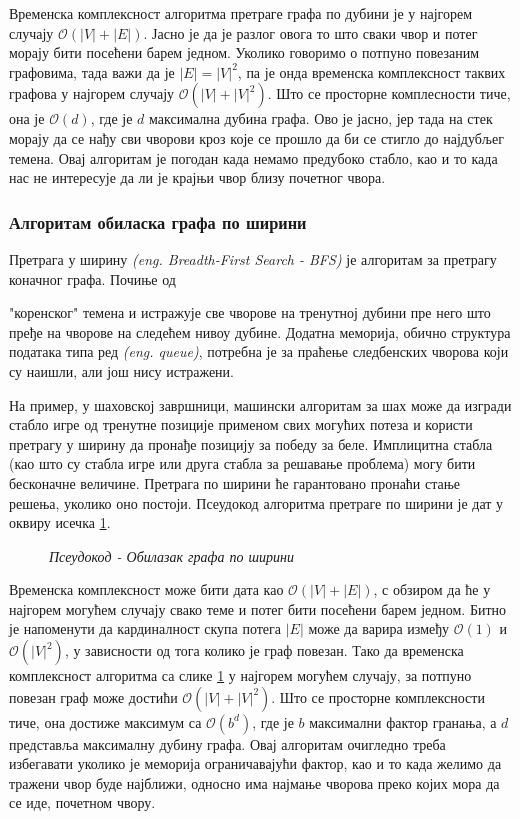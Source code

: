 \par
Временска комплексност алгоритма претраге графа по дубини је у најгорем случају $\mathcal{O}(|V| + |E|)$. Јасно је да је разлог овога то што сваки чвор и потег морају бити посећени барем једном. Уколико говоримо о потпуно повезаним графовима, тада важи да је $|E| = |V|^2$, па је онда временска комплексност таквих графова у најгорем случају $\mathcal{O}(|V| + |V|^2)$. Што се просторне комплесности тиче, она је $\mathcal{O}(d)$, где је $d$ максимална дубина графа. Ово је јасно, јер тада на стек морају да се нађу сви чворови кроз које се прошло да би се стигло до најдубљег темена. Овај алгоритам је погодан када немамо предубоко стабло, као и то када нас не интересује да ли је крајњи чвор близу почетног чвора.

\subsubsection{Алгоритам обиласка графа по ширини}
Претрага у ширину \textit{(eng. Breadth-First Search - BFS)} је алгоритам за претрагу коначног графа. Почиње од \par{"коренског"} темена и истражује све чворове на тренутној дубини пре него што пређе на чворове на следећем нивоу дубине. Додатна меморија, обично структура података типа ред \textit{(eng. queue)}, потребна је за праћење следбенских чворова који су наишли, али још нису истражени.

\par
На пример, у шаховској завршници, машински алгоритам за шах може да изгради стабло игре од тренутне позиције применом свих могућих потеза и користи претрагу у ширину да пронађе позицију за победу за беле. Имплицитна стабла (као што су стабла игре или друга стабла за решавање проблема) могу бити бесконачне величине. Претрага по ширини ће гарантовано пронаћи стање решења, уколико оно постоји. Псеудокод алгоритма претраге по ширини је дат у оквиру исечка \ref{pseudocode:algorithm-bfs-traversal-pseudo}.

\begin{figure}[h!]
\centering

\caption{\textit{Псеудокод - Обилазак графа по ширини}}
\label{pseudocode:algorithm-bfs-traversal-pseudo}
\end{figure}

\par
Временска комплексност може бити дата као $\mathcal{O}(|V| + |E|)$, с обзиром да ће у најгорем могућем случају свако теме и потег бити посећени барем једном. Битно је напоменути да кардиналност скупа потега $|E|$ може да варира између $\mathcal{O}(1)$ и $\mathcal{O}(|V|^2)$, у зависности од тога колико је граф повезан. Тако да временска комплексност алгоритма са слике \ref{pseudocode:algorithm-bfs-traversal-pseudo} у најгорем могућем случају, за потпуно повезан граф може достићи $\mathcal{O}(|V|+|V|^2)$. Што се просторне комплексности тиче, она достиже максимум са $\mathcal{O}(b^d)$, где је $b$ максимални фактор гранања, а $d$ представља максималну дубину графа. Овај алгоритам очигледно треба избегавати уколико је меморија ограничавајући фактор, као и то када желимо да тражени чвор буде најближи, односно има најмање чворова преко којих мора да се иде, почетном чвору. 